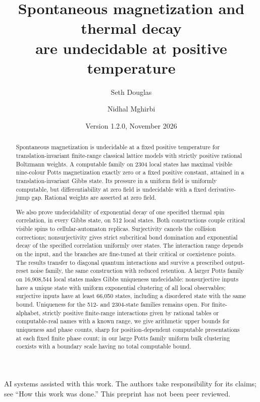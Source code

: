 \documentclass[11pt,a4paper]{article}
\title{Spontaneous magnetization and thermal decay\\ are undecidable at positive temperature}
\author{Seth Douglas \and Nidhal Mghirbi}
\date{Version 1.2.0, November 2026}
\theoremstyle{remark}
\numberwithin{equation}{section}
\begin{document}
\maketitle
\begin{abstract}
Spontaneous magnetization is undecidable at a fixed positive temperature for translation-invariant finite-range classical lattice models with strictly positive rational Boltzmann weights. A computable family on 2304 local states has maximal visible nine-colour Potts magnetization exactly zero or a fixed positive constant, attained in a translation-invariant Gibbs state. Its pressure in a uniform field is uniformly computable, but differentiability at zero field is undecidable with a fixed derivative-jump gap. Rational weights are asserted at zero field.

We also prove undecidability of exponential decay of one specified thermal spin correlation, in every Gibbs state, on 512 local states. Both constructions couple critical visible spins to cellular-automaton replicas. Surjectivity cancels the collision corrections; nonsurjectivity gives strict subcritical bond domination and exponential decay of the specified correlation uniformly over states. The interaction range depends on the input, and the branches are fine-tuned at their critical or coexistence points. The results transfer to diagonal quantum interactions and survive a prescribed output-reset noise family, the same construction with reduced retention. A larger Potts family on 16,908,544 local states makes Gibbs uniqueness undecidable: nonsurjective inputs have a unique state with uniform exponential clustering of all local observables; surjective inputs have at least 66,050 states, including a disordered state with the same bound. Uniqueness for the 512- and 2304-state families remains open.
For finite-alphabet, strictly positive finite-range interactions given by rational tables or computable-real names with a known range, we give arithmetic upper bounds for uniqueness and phase counts, sharp for position-dependent computable presentations at each fixed finite phase count; in our large Potts family uniform bulk clustering coexists with a boundary scale having no total computable bound.
\end{abstract}
\begin{center}\small AI systems assisted with this work. The authors take responsibility for its claims; see ``How this work was done.'' This preprint has not been peer reviewed.\end{center}
\medskip\noindent\small
\end{document}
